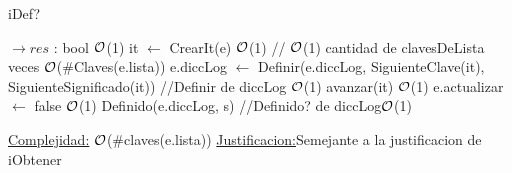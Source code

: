 \begin{Representacion}
\begin{Algoritmos}
	\begin{algorithm}[H]
		\caption{iDef?}
		
		\begin{algorithmic}[1]
			 $\to res$ : bool
			 \Comment $\mathcal{O}$(1)
			\State it $\gets$ CrearIt(e) \Comment $\mathcal{O}$(1)
			 // $\mathcal{O}$(1) cantidad de clavesDeLista veces \Comment $\mathcal{O}$($\#$Claves(e.lista))
			\State e.diccLog $\gets$ Definir(e.diccLog, SiguienteClave(it), SiguienteSignificado(it)) //Definir de diccLog \Comment $\mathcal{O}$(1) 
			\State avanzar(it) \Comment $\mathcal{O}$(1) 
			\EndWhile
			\State e.actualizar $\gets$ false \Comment $\mathcal{O}$(1) 
			\EndIf
			\State Definido(e.diccLog, s) //Definido? de diccLog$\mathcal{O}$(1)
			\EndProcedure
		\end{algorithmic}
		\underline{Complejidad:} $\mathcal{O}$($\#$claves(e.lista))
		\underline{Justificacion:}Semejante a la justificacion de iObtener
		
	\end{algorithm}

\end{Algoritmos}
\end{Representacion}